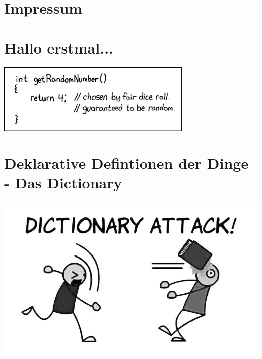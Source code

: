 \documentclass[12pt,a4paper]{scrartcl}
\begin{document}


\setcounter{tocdepth}{2} %
\tableofcontents
\newpage



\section{Impressum}

\newpage

\section{Hallo erstmal...}


    \includegraphics[width=0.7\textwidth]{comics/random_number.png}
\newpage

\label{glossar}
\section{Deklarative Defintionen der Dinge - Das Dictionary}

\begin{center}
	\includegraphics[scale=0.5]{comics/dictionary-attack}
\end{center}
\end{document}
